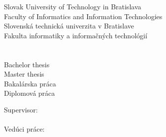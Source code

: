 
\begin{center}
\thispagestyle{empty}
{
	{\Large Slovak University of Technology in Bratislava}\textbf{}\\
	{\Large Faculty of Informatics and Information Technologies}\textbf{}\\[\baselineskip]
}
{
	{\Large Slovenská technická univerzita v Bratislave}\textbf{}\\
	{\Large Fakulta informatiky a informačných technológií}\textbf{}\\[\baselineskip]
}
\vspace*{5cm}
{\Large \Author}\textbf{}\\[\baselineskip]
{\huge \Title}\textbf{}\\[\baselineskip]
{
	{
		{\large Bachelor thesis}\\
	}
	{
		{\large Master thesis}\\
	}
}
{
	{
		{\large Bakalárska práca}\\
	}
	{
		{\large Diplomová práca}\\
	}
}

\end{center}
\vspace*{6.5cm}
{
	Supervisor: \Supervisor \\\\
}
{
	Vedúci práce: \Supervisor \\\\
}
\Month\ \Year

\newpage
\null


